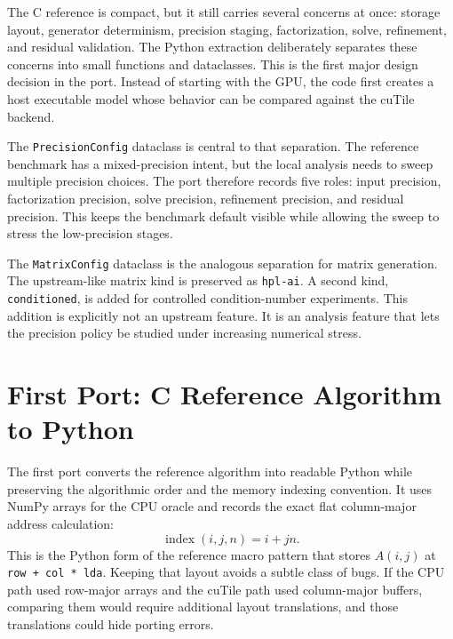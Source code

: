 \documentclass[11pt]{article}
\newcommand{\cutile}{cuTile}
\newcommand{\code}[1]{\texttt{#1}}
\begin{document}
The C reference is compact, but it still carries several concerns at once:
storage layout, generator determinism, precision staging, factorization,
solve, refinement, and residual validation. The Python extraction deliberately
separates these concerns into small functions and dataclasses. This is the
first major design decision in the port. Instead of starting with the GPU, the
code first creates a host executable model whose behavior can be compared
against the \cutile{} backend.

The \code{PrecisionConfig} dataclass is central to that separation. The
reference benchmark has a mixed-precision intent, but the local analysis needs
to sweep multiple precision choices. The port therefore records five roles:
input precision, factorization precision, solve precision, refinement
precision, and residual precision. This keeps the benchmark default visible
while allowing the sweep to stress the low-precision stages.

The \code{MatrixConfig} dataclass is the analogous separation for matrix
generation. The upstream-like matrix kind is preserved as \code{hpl-ai}. A
second kind, \code{conditioned}, is added for controlled condition-number
experiments. This addition is explicitly not an upstream feature. It is an
analysis feature that lets the precision policy be studied under increasing
numerical stress.

\section{First Port: C Reference Algorithm to Python}

The first port converts the reference algorithm into readable Python while
preserving the algorithmic order and the memory indexing convention. It uses
NumPy arrays for the CPU oracle and records the exact flat column-major address
calculation:
\[
  \operatorname{index}(i,j,n) = i + jn.
\]
This is the Python form of the reference macro pattern that stores
\(A(i,j)\) at \code{row + col * lda}. Keeping that layout avoids a subtle
class of bugs. If the CPU path used row-major arrays and the \cutile{} path
used column-major buffers, comparing them would require additional layout
translations, and those translations could hide porting errors.
\end{document}
